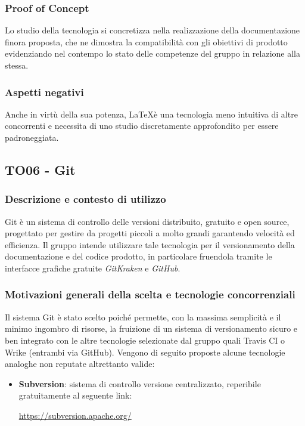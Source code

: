 \documentclass[./../Technology Baseline.tex]{subfiles}
\begin{document}
\subsubsection{Proof of Concept}
Lo studio della tecnologia si concretizza nella realizzazione della documentazione finora proposta, che ne dimostra la compatibilità con gli obiettivi di prodotto evidenziando nel contempo lo stato delle competenze del gruppo in relazione alla stessa.

\subsubsection{Aspetti negativi}
Anche in virtù della sua potenza, \LaTeX è una tecnologia meno intuitiva di altre concorrenti e necessita di uno studio discretamente approfondito per essere padroneggiata.

\subsection{TO06 - Git}

\subsubsection{Descrizione e contesto di utilizzo}
Git è un sistema di controllo delle versioni distribuito, gratuito e open source, progettato per gestire da progetti piccoli a molto grandi garantendo velocità ed efficienza. Il gruppo intende utilizzare tale tecnologia per il versionamento della documentazione e del codice prodotto, in particolare fruendola tramite le interfacce grafiche gratuite \textit{GitKraken} e \textit{GitHub}.

\subsubsection{Motivazioni generali della scelta e tecnologie concorrenziali}
Il sistema Git è stato scelto poiché permette, con la massima semplicità e il minimo ingombro di risorse, la fruizione di un sistema di versionamento sicuro e ben integrato con le altre tecnologie selezionate dal gruppo quali Travis CI o Wrike (entrambi via GitHub). Vengono di seguito proposte alcune tecnologie analoghe non reputate altrettanto valide:
\begin{itemize}
	\item \textbf{Subversion}: sistema di controllo versione centralizzato, reperibile gratuitamente al seguente link:
	\begin{center}
		\url{https://subversion.apache.org/}
	\end{center}
\end{itemize}
\end{document}
